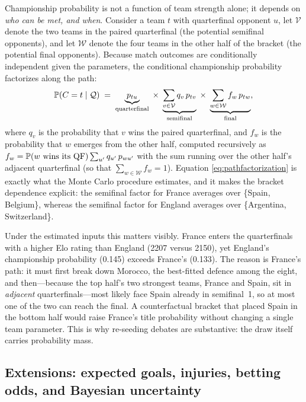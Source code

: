 Championship probability is not a function of team strength alone; it depends
on \emph{who can be met, and when}. Consider a team $t$ with quarterfinal
opponent $u$, let $\mathcal{V}$ denote the two teams in the paired
quarterfinal (the potential semifinal opponents), and let $\mathcal{W}$ denote
the four teams in the other half of the bracket (the potential final
opponents). Because match outcomes are conditionally independent given the
parameters, the conditional championship probability factorizes along the
path:
\begin{equation}
\mathbb{P}(C = t \mid \mathcal{Q})
\;=\;
\underbrace{p_{tu}}_{\text{quarterfinal}}
\;\times\;
\underbrace{\sum_{v \in \mathcal{V}} q_v\, p_{tv}}_{\text{semifinal}}
\;\times\;
\underbrace{\sum_{w \in \mathcal{W}} f_w\, p_{tw}}_{\text{final}},
\label{eq:pathfactorization}
\end{equation}
where $q_v$ is the probability that $v$ wins the paired quarterfinal, and
$f_w$ is the probability that $w$ emerges from the other half, computed
recursively as $f_w = \mathbb{P}(w \text{ wins its QF}) \sum_{u'} q_{u'}\,p_{wu'}$
with the sum running over the other half's adjacent quarterfinal (so that
$\sum_{w \in \mathcal{W}} f_w = 1$). Equation
\eqref{eq:pathfactorization} is exactly what the Monte Carlo procedure
estimates, and it makes the bracket dependence explicit: the semifinal factor
for France averages over \{Spain, Belgium\}, whereas the semifinal factor for
England averages over \{Argentina, Switzerland\}.

Under the estimated inputs this matters visibly. France enters the
quarterfinals with a higher Elo rating than England (2207 versus 2150), yet
England's championship probability (0.145) exceeds France's (0.133). The
reason is France's path: it must first break down Morocco, the best-fitted
defence among the eight, and then---because the top half's two strongest
teams, France and Spain, sit in \emph{adjacent} quarterfinals---most likely
face Spain already in semifinal~1, so at most one of the two can reach the
final. A counterfactual bracket that placed Spain in the bottom half would
raise France's title probability without changing a single team parameter.
This is why re-seeding debates are substantive: the draw itself carries
probability mass.

\subsection{Extensions: expected goals, injuries, betting odds, and Bayesian
uncertainty}
\label{app:extensions}

